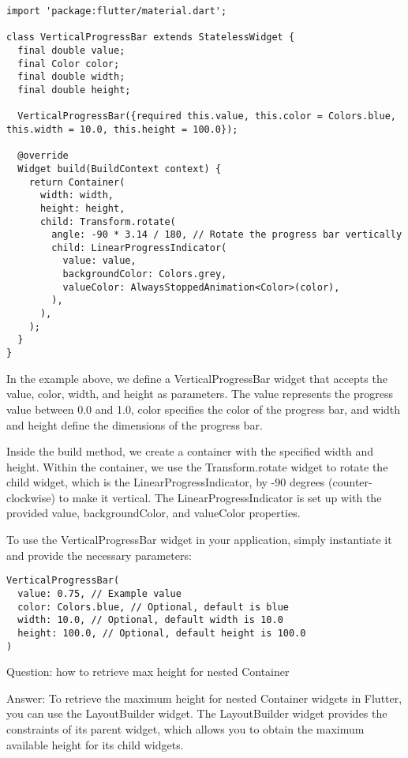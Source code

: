\begin{lstlisting}
import 'package:flutter/material.dart';

class VerticalProgressBar extends StatelessWidget {
  final double value;
  final Color color;
  final double width;
  final double height;

  VerticalProgressBar({required this.value, this.color = Colors.blue, this.width = 10.0, this.height = 100.0});

  @override
  Widget build(BuildContext context) {
    return Container(
      width: width,
      height: height,
      child: Transform.rotate(
        angle: -90 * 3.14 / 180, // Rotate the progress bar vertically
        child: LinearProgressIndicator(
          value: value,
          backgroundColor: Colors.grey,
          valueColor: AlwaysStoppedAnimation<Color>(color),
        ),
      ),
    );
  }
}
\end{lstlisting}

In the example above, we define a VerticalProgressBar widget that accepts the value, color, width, and height as 
parameters. The value represents the progress value between 0.0 and 1.0, color specifies the color of the 
progress bar, and width and height define the dimensions of the progress bar.

Inside the build method, we create a container with the specified width and height. Within the container, 
we use the Transform.rotate widget to rotate the child widget, which is the LinearProgressIndicator, 
by -90 degrees (counter-clockwise) to make it vertical. The LinearProgressIndicator is set up with the 
provided value, backgroundColor, and valueColor properties.

To use the VerticalProgressBar widget in your application, simply instantiate it and provide the necessary parameters:

\begin{lstlisting}
VerticalProgressBar(
  value: 0.75, // Example value
  color: Colors.blue, // Optional, default is blue
  width: 10.0, // Optional, default width is 10.0
  height: 100.0, // Optional, default height is 100.0
)
\end{lstlisting}


Question: how to retrieve max height for nested Container

Answer: To retrieve the maximum height for nested Container widgets in Flutter, you can use the LayoutBuilder 
widget. The LayoutBuilder widget provides the constraints of its parent widget, which allows you to obtain 
the maximum available height for its child widgets.

